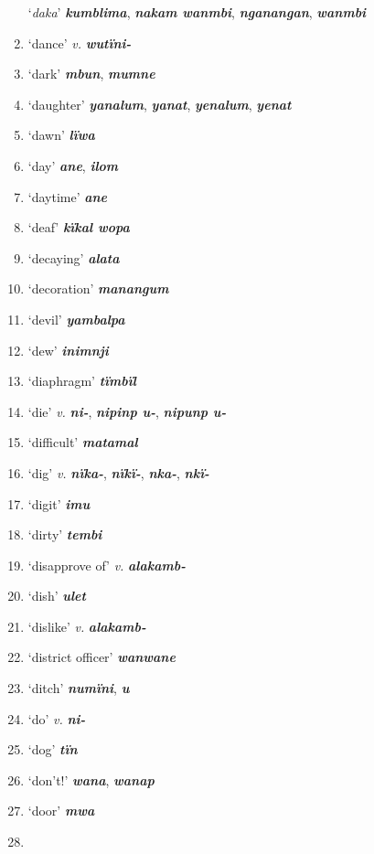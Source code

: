 \begin{enumerate}[noitemsep, label={}, align=left, widest=190, labelsep=1ex,leftmargin=*,itemindent=-10pt]
‘\textit{daka}’ \textbf{\textit{kumblima}}, \textbf{\textit{nakam wanmbi}}, \textbf{\textit{nganangan}}, \textbf{\textit{wanmbi}} \item
‘dance’ \textit{v.} \textbf{\textit{wutïni-}} \item
‘dark’ \textbf{\textit{mbun}}, \textbf{\textit{mumne}} \item
‘daughter’ \textbf{\textit{yanalum}}, \textbf{\textit{yanat}}, \textbf{\textit{yenalum}}, \textbf{\textit{yenat}} \item
‘dawn’ \textbf{\textit{lïwa}} \item
‘day’ \textbf{\textit{ane}}, \textbf{\textit{ilom}} \item
‘daytime’ \textbf{\textit{ane}} \item
‘deaf’ \textbf{\textit{kïkal wopa}} \item
‘decaying’ \textbf{\textit{alata}} \item
‘decoration’ \textbf{\textit{manangum}} \item
‘devil’ \textbf{\textit{yambalpa}} \item
‘dew’ \textbf{\textit{inimnji}} \item
‘diaphragm’ \textbf{\textit{tïmbïl}} \item
‘die’ \textit{v.} \textbf{\textit{ni-}}, \textbf{\textit{nipinp u-}}, \textbf{\textit{nipunp u-}} \item
‘difficult’ \textbf{\textit{matamal}} \item
‘dig’ \textit{v.} \textbf{\textit{nïka-}}, \textbf{\textit{nïkï-}}, \textbf{\textit{nka-}}, \textbf{\textit{nkï-}} \item
‘digit’ \textbf{\textit{imu}} \item
‘dirty’ \textbf{\textit{tembi}} \item
‘disapprove of’ \textit{v.} \textbf{\textit{alakamb-}} \item
‘dish’ \textbf{\textit{ulet}} \item
‘dislike’ \textit{v.} \textbf{\textit{alakamb-}} \item
‘district officer’ \textbf{\textit{wanwane}} \item
‘ditch’ \textbf{\textit{numïni}}, \textbf{\textit{u}} \item
‘do’ \textit{v.} \textbf{\textit{ni-}} \item
‘dog’ \textbf{\textit{tïn}} \item
‘don’t!’ \textbf{\textit{wana}}, \textbf{\textit{wanap}} \item
‘door’ \textbf{\textit{mwa}} \item

\end{enumerate}
